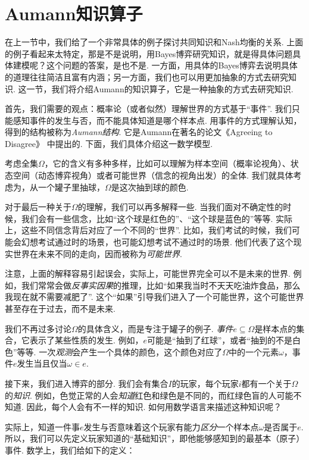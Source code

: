 \section{Aumann知识算子}

在上一节中，我们给了一个非常具体的例子探讨共同知识和Nash均衡的关系. 上面的例子看起来太特定，那是不是说明，用Bayes博弈研究知识，就是得具体问题具体建模呢？这个问题的答案，是也不是. 一方面，用具体的Bayes博弈去说明具体的道理往往简洁且富有内涵；另一方面，我们也可以用更加抽象的方式去研究知识. 这一节，我们将介绍Aumann的知识算子，它是一种抽象的方式去研究知识.

首先，我们需要的观点：概率论（或者似然）理解世界的方式基于“事件”. 我们只能感知事件的发生与否，而不能具体知道是哪个样本点. 用事件的方式理解认知，得到的结构被称为\textit{Aumann结构}. 它是Aumann在著名的论文《Agreeing to Disagree》\cite{aumannAgreeingDisagree1976} 中提出的. 下面，我们具体介绍这一数学模型. 

考虑全集$\Omega$，它的含义有多种多样，比如可以理解为样本空间（概率论视角）、状态空间（动态博弈视角）或者可能世界（信念的视角出发）的全体. 我们就具体考虑为，从一个罐子里抽球，$\Omega$是这次抽到球的颜色. 

对于最后一种关于$\Omega$的理解，我们可以再多解释一些. 当我们面对不确定性的时候，我们会有一些信念，比如“这个球是红色的”、“这个球是蓝色的”等等. 实际上，这些不同信念背后对应了一个不同的“世界”. 比如，我们考试的时候，我们可能会幻想考试通过时的场景，也可能幻想考试不通过时的场景. 他们代表了这个现实世界在未来不同的走向，因而被称为\textit{可能世界}.

注意，上面的解释容易引起误会，实际上，可能世界完全可以不是未来的世界. 例如，我们常常会做\textit{反事实因果}的推理，比如“如果我当时不天天吃油炸食品，那么我现在就不需要减肥了”. 这个“如果”引导我们进入了一个可能世界，这个可能世界甚至存在于过去，而不是未来.

我们不再过多讨论$\Omega$的具体含义，而是专注于罐子的例子. \textit{事件}$e\subseteq \Omega$是样本点的集合，它表示了某些性质的发生. 例如，$e$可能是“抽到了红球”，或者“抽到的不是白色”等等. 一次\textit{观测}会产生一个具体的颜色，这个颜色对应了$\Omega$中的一个元素$\omega$，事件$e$发生当且仅当$\omega\in e$.

接下来，我们进入博弈的部分. 我们会有集合$I$的玩家，每个玩家$i$都有一个关于$\Omega$的\textit{知识}. 例如，色觉正常的人会\textit{知道}红色和绿色是不同的，而红绿色盲的人可能不知道. 因此，每个人会有不一样的知识. 如何用数学语言来描述这种知识呢？

实际上，知道一件事$e$发生与否意味着这个玩家有能力\textit{区分}一个样本点$\omega$是否属于$e$. 所以，我们可以先定义玩家知道的“基础知识”，即他能够感知到的最基本（原子）事件. 数学上，我们给如下的定义：

